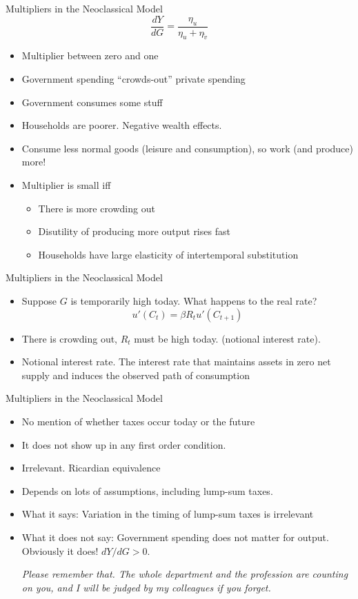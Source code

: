 \documentclass[11pt,aspectratio=169,xcolor={dvipsnames},hyperref={pdftex,pdfpagemode=UseNone,hidelinks,pdfdisplaydoctitle=true},usepdftitle=false]{beamer}
\begin{document}
\begin{frame}{Multipliers in the Neoclassical Model}
$$\frac{dY}{dG} = \frac{\eta_u}{\eta_u + \eta_{\tilde{v}}}$$
\begin{itemize}
\item Multiplier between zero and one
\item Government spending ``crowds-out'' private spending
\item Government consumes some stuff
\item Households are poorer. Negative wealth effects.
\item Consume less normal goods (leisure and consumption), so work (and produce) more!
\item Multiplier is small iff
\begin{itemize}
\item There is more crowding out
\item Disutility of producing more output rises fast
\item Households have large elasticity of intertemporal substitution
\end{itemize}
\end{itemize}
\end{frame}

\begin{frame}{Multipliers in the Neoclassical Model}
\begin{itemize}
\item Suppose $G$ is temporarily high today. What happens to the real rate?
$$u'(C_t) = \beta R_t u'(C_{t+1})$$
\item There is crowding out, $R_t$ must be high today. (notional interest rate).
\item Notional interest rate. The interest rate that maintains assets in zero net supply and induces the observed path of consumption
\end{itemize}
\end{frame}

\begin{frame}{Multipliers in the Neoclassical Model}
\begin{itemize}
\item No mention of whether taxes occur today or the future
\item It does not show up in any first order condition.
\item Irrelevant. Ricardian equivalence
\item Depends on lots of assumptions, including lump-sum taxes.
\item What it says:
Variation in the timing of lump-sum taxes is irrelevant
\item What it does not say:
Government spending does not matter for output. Obviously it does! $dY/dG > 0$.

\textit{Please remember that. The whole department and the profession are counting on you, and I will be judged by my colleagues if you forget.}
\end{itemize}
\end{frame}
\end{document}
